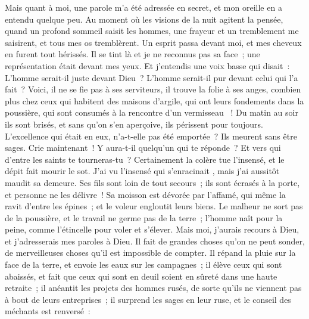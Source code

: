 \begin{multicols}{2}
Mais quant à moi, une parole m'a été adressée en secret, et mon oreille en a entendu quelque peu.
Au moment où les visions de la nuit agitent la pensée, quand un profond sommeil saisit les hommes,
une frayeur et un tremblement me saisirent, et tous mes os tremblèrent.
Un esprit passa devant moi, et mes cheveux en furent tout hérissés. 
Il se tint là et je ne reconnus pas sa face~; une représentation était devant mes yeux. Et j'entendis une voix basse qui disait~:
L'homme serait-il juste devant Dieu~? L'homme serait-il pur devant celui qui l'a fait~?
Voici, il ne se fie pas à ses serviteurs, il trouve la folie à ses anges,
combien plus chez ceux qui habitent des maisons d'argile, qui ont leurs fondements dans la poussière, qui sont consumés à la rencontre d'un vermisseau ~!
Du matin au soir ils sont brisés, et sans qu'on s'en aperçoive, ils périssent pour toujours. 
L'excellence qui était en eux, n'a-t-elle pas été emportée~? Ils meurent sans être sages. 
\VerseOne{}Crie maintenant~! Y aura-t-il quelqu'un qui te réponde~? Et vers qui d'entre les saints te tourneras-tu~?
Certainement la colère tue l'insensé, et le dépit fait mourir le sot.
J'ai vu l'insensé qui s'enracinait , mais j'ai aussitôt maudit sa demeure.
Ses fils sont loin de tout secours~; ils sont écrasés à la porte, et personne ne les délivre~!
Sa moisson est dévorée par l'affamé, qui même la ravit d'entre les épines~; et le voleur engloutit leurs biens.
Le malheur ne sort pas de la poussière, et le travail ne germe pas de la terre~;
l'homme naît pour la peine, comme l'étincelle pour voler et s'élever.
Mais moi, j'aurais recours à Dieu, et j'adresserais mes paroles à Dieu.
Il fait de grandes choses qu'on ne peut sonder, de merveilleuses choses qu'il est impossible de compter.
Il répand la pluie sur la face de la terre, et envoie les eaux sur les campagnes~;
il élève ceux qui sont abaissés, et fait que ceux qui sont en deuil soient en sûreté dans une haute retraite~;
il anéantit les projets des hommes rusés, de sorte qu'ils ne viennent pas à bout de leurs entreprises~;
il surprend les sages en leur ruse, et le conseil des méchants est renversé~:

\end{multicols}
